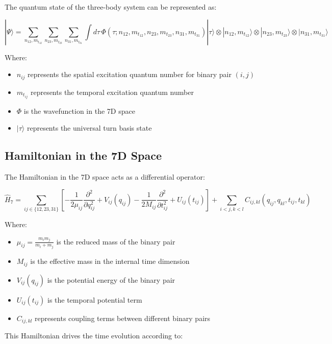 \documentclass{article}
\begin{document}
The quantum state of the three-body system can be represented as:

\begin{equation}
|\Psi\rangle = \sum_{n_{12},m_{t_{12}}} \sum_{n_{23},m_{t_{23}}} \sum_{n_{31},m_{t_{31}}} \int d\tau \, \Phi(\tau; n_{12}, m_{t_{12}}, n_{23}, m_{t_{23}}, n_{31}, m_{t_{31}}) |\tau\rangle \otimes |n_{12}, m_{t_{12}}\rangle \otimes |n_{23}, m_{t_{23}}\rangle \otimes |n_{31}, m_{t_{31}}\rangle
\end{equation}

Where:
\begin{itemize}
\item $n_{ij}$ represents the spatial excitation quantum number for binary pair $(i,j)$
\item $m_{t_{ij}}$ represents the temporal excitation quantum number
\item $\Phi$ is the wavefunction in the 7D space
\item $|\tau\rangle$ represents the universal turn basis state
\end{itemize}

\subsection{Hamiltonian in the 7D Space}

The Hamiltonian in the 7D space acts as a differential operator:

\begin{equation}
\hat{H}_7 = \sum_{ij \in \{12,23,31\}} \left[-\frac{1}{2\mu_{ij}}\frac{\partial^2}{\partial q_{ij}^2} + V_{ij}(q_{ij}) - \frac{1}{2M_{ij}}\frac{\partial^2}{\partial t_{ij}^2} + U_{ij}(t_{ij})\right] + \sum_{i<j,k<l} C_{ij,kl}(q_{ij},q_{kl},t_{ij},t_{kl})
\end{equation}

Where:
\begin{itemize}
\item $\mu_{ij} = \frac{m_i m_j}{m_i+m_j}$ is the reduced mass of the binary pair
\item $M_{ij}$ is the effective mass in the internal time dimension
\item $V_{ij}(q_{ij})$ is the potential energy of the binary pair
\item $U_{ij}(t_{ij})$ is the temporal potential term
\item $C_{ij,kl}$ represents coupling terms between different binary pairs
\end{itemize}

This Hamiltonian drives the time evolution according to:
\end{document}
